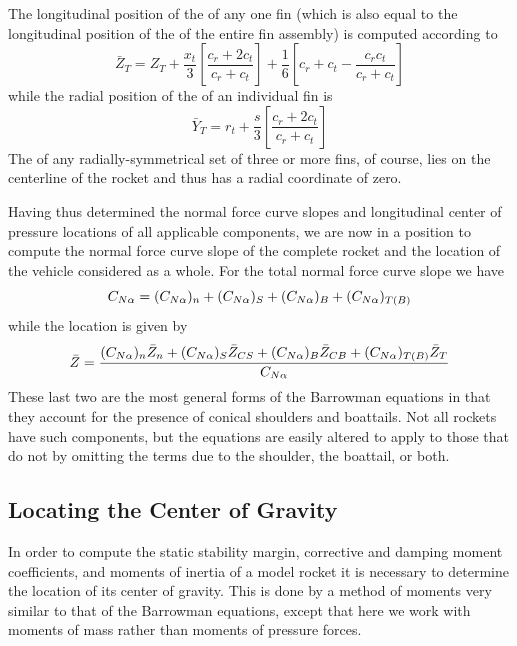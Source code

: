 The longitudinal position of the \CP{} of any one fin (which is also equal
to the longitudinal position of the \CP{} of the entire fin assembly) is
computed according to
\begin{equation}\label{ch2:eq:89}
\bar{Z}_T = Z_T + \frac{x_t}{3}\left[\frac{c_r + 2c_t}{c_r + c_t}\right] + \frac{1}{6}\left[c_r + c_t - \frac{c_r c_t}{c_r + c_t}\right]
\end{equation}
while the radial position of the \CP{} of an individual fin is
\begin{equation}\label{ch2:eq:90}
\bar{Y}_T = r_t + \frac{s}{3}\left[\frac{c_r + 2c_t}{c_r + c_t}\right]
\end{equation}
The \CP{} of any radially-symmetrical set of three or more fins, of course,
lies on the centerline of the rocket and thus has a radial coordinate of
zero.

Having thus determined the normal force curve slopes and longitudinal center
of pressure locations of all applicable components, we are now in a position
to compute the normal force curve slope of the complete rocket and the \CP{}
location of the vehicle considered as a whole. For the total normal force
curve slope we have
\begin{equation}\label{ch2:eq:91}
C_{N\alpha} = (C_{N\alpha})_n + (C_{N\alpha})_S + (C_{N\alpha})_B + (C_{N\alpha})_{T(B)}
\end{equation}
while the \CP{} location is given by
\begin{equation}\label{ch2:eq:92}
\bar{Z} = \frac{(C_{N\alpha})_n \bar{Z}_n + (C_{N\alpha})_S \bar{Z}_{CS} + (C_{N\alpha})_B \bar{Z}_{CB} + (C_{N\alpha})_{T(B)} \bar{Z}_T}{C_{N\alpha}}
\end{equation}
These last two are the most general forms of the Barrowman equations in that
they account for the presence of conical shoulders and boattails. Not all
rockets have such components, but the equations are easily altered to apply
to those that do not by omitting the terms due to the shoulder, the
boattail, or both.

\subsection{Locating the Center of Gravity}\label{ch2:sec:4.2}

In order to compute the static stability margin, corrective and damping
moment coefficients, and moments of inertia of a model rocket it is
necessary to determine the location of its center of gravity. This is done
by a method of moments very similar to that of the Barrowman equations,
except that here we work with moments of mass rather than moments of
pressure forces.

